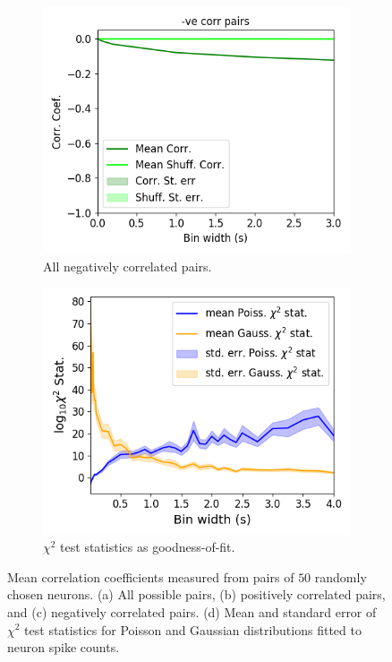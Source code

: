 \begin{figure}[h]
\begin{subfigure}[h]{0.5\linewidth}
            \label{fig:correlations_pos_pairs}
        \end{subfigure}
        \begin{subfigure}[h]{0.5\linewidth}
            \includegraphics[width=\linewidth]{figures/eight_probe/Krebs_corr_neg_pairs.png}
            \caption{All negatively correlated pairs.}
            \label{fig:correlations_neg_pairs}
        \end{subfigure}
        \begin{subfigure}[h]{0.5\linewidth}
            \includegraphics[width=\linewidth]{figures/eight_probe/Krebs_stats_by_bin_width.png}
            \caption{$\chi^2$ test statistics as goodness-of-fit.}
            \label{fig:chi_squared_fits}
        \end{subfigure}
        \caption{Mean correlation coefficients measured from pairs of $50$ randomly chosen neurons. (a) All possible pairs, (b) positively correlated pairs, and (c) negatively correlated pairs. (d) Mean and standard error of $\chi^2$ test statistics for Poisson and Gaussian distributions fitted to neuron spike counts.}
        \label{fig:correlations_vs_bin_widths}
    \end{figure}

